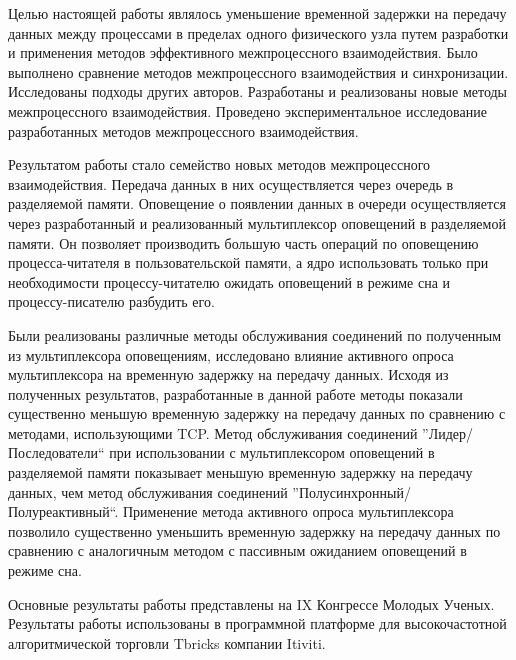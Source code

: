 \startconclusionpage

Целью настоящей работы являлось уменьшение временной задержки на передачу данных между процессами в пределах одного физического узла путем разработки и применения методов эффективного межпроцессного взаимодействия. Было выполнено сравнение методов межпроцессного взаимодействия и синхронизации. Исследованы подходы других авторов. Разработаны и реализованы новые методы межпроцессного взаимодействия. Проведено экспериментальное исследование разработанных методов межпроцессного взаимодействия.

Результатом работы стало семейство новых методов межпроцессного взаимодействия. Передача данных в них осуществляется через очередь в разделяемой памяти. Оповещение о появлении данных в очереди осуществляется через разработанный и реализованный мультиплексор оповещений в разделяемой памяти. Он позволяет производить большую часть операций по оповещению процесса-читателя в пользовательской памяти, а ядро использовать только при необходимости процессу-читателю ожидать оповещений в режиме сна и процессу-писателю разбудить его.

Были реализованы различные методы обслуживания соединений по полученным из мультиплексора оповещениям, исследовано влияние активного опроса мультиплексора на временную задержку на передачу данных. Исходя из полученных результатов, разработанные в данной работе методы показали существенно меньшую временную задержку на передачу данных по сравнению с методами, использующими TCP. Метод обслуживания соединений ''Лидер/Последователи`` при использовании с мультиплексором оповещений в разделяемой памяти показывает  меньшую временную задержку на передачу данных, чем метод обслуживания соединений ''Полусинхронный/Полуреактивный``. Применение метода активного опроса мультиплексора позволило существенно уменьшить временную задержку на передачу данных по сравнению с аналогичным методом с пассивным ожиданием оповещений в режиме сна.

Основные результаты работы представлены на IX Конгрессе Молодых Ученых. Результаты работы использованы в программной платформе для высокочастотной алгоритмической торговли Tbricks компании Itiviti.